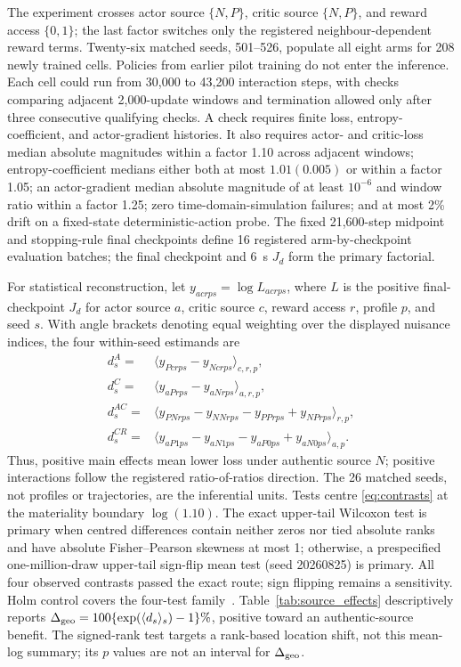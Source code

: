 \documentclass[conference,a4paper]{IEEEtran}
\begin{document}
The experiment crosses actor source $\{N,P\}$, critic source $\{N,P\}$, and
reward access $\{0,1\}$; the last factor switches only the registered
neighbour-dependent reward terms. Twenty-six matched seeds, 501--526, populate
all eight arms for 208 newly trained cells. Policies from earlier pilot training
do not enter the inference. Each cell could run from 30,000 to 43,200
interaction steps, with checks comparing adjacent 2,000-update windows and
termination allowed only after three consecutive qualifying checks. A check
requires finite loss, entropy-coefficient, and actor-gradient histories. It also
requires actor- and critic-loss median absolute magnitudes within a factor 1.10
across adjacent windows; entropy-coefficient medians either both at most
$1.01(0.005)$ or within a factor 1.05; an actor-gradient median absolute
magnitude of at least $10^{-6}$ and window ratio within a factor 1.25; zero
time-domain-simulation failures; and at most 2\% drift on a fixed-state
deterministic-action probe. The fixed 21,600-step midpoint and stopping-rule
final checkpoints define 16 registered arm-by-checkpoint evaluation batches;
the final checkpoint and \SI{6}{s} $J_d$ form the primary factorial.

For statistical reconstruction, let $y_{acrps}=\log L_{acrps}$, where $L$ is
the positive final-checkpoint $J_d$ for actor source $a$, critic source $c$,
reward access $r$, profile $p$, and seed $s$. With angle brackets denoting
equal weighting over the displayed nuisance indices, the four within-seed
estimands are
\begin{align}
d_s^A={}&\langle y_{Pcrps}-y_{Ncrps}\rangle_{c,r,p},\nonumber\\
d_s^C={}&\langle y_{aPrps}-y_{aNrps}\rangle_{a,r,p},\nonumber\\
d_s^{AC}={}&\langle y_{PNrps}-y_{NNrps}
-y_{PPrps}+y_{NPrps}\rangle_{r,p},\nonumber\\
d_s^{CR}={}&\langle y_{aP1ps}-y_{aN1ps}
-y_{aP0ps}+y_{aN0ps}\rangle_{a,p}.
\label{eq:contrasts}
\end{align}
Thus, positive main effects mean lower loss under authentic source $N$;
positive interactions follow the registered ratio-of-ratios direction. The 26
matched seeds, not profiles or trajectories, are the inferential units. Tests
centre \eqref{eq:contrasts} at the materiality boundary $\log(1.10)$. The exact
upper-tail Wilcoxon test is primary when centred differences contain neither
zeros nor tied absolute ranks and have absolute Fisher--Pearson skewness at
most 1; otherwise, a prespecified one-million-draw upper-tail sign-flip mean
test (seed 20260825) is primary. All four observed contrasts passed the exact
route; sign flipping remains a sensitivity. Holm control covers the four-test
family~\cite{holm1979simple}.
Table~\ref{tab:source_effects} descriptively reports
$\Delta_{\rm geo}=100\{\exp(\langle d_s\rangle_s)-1\}\%$, positive toward an
authentic-source benefit. The signed-rank test targets a rank-based location
shift, not this mean-log summary; its $p$ values are not an interval for
$\Delta_{\rm geo}$.
\end{document}
